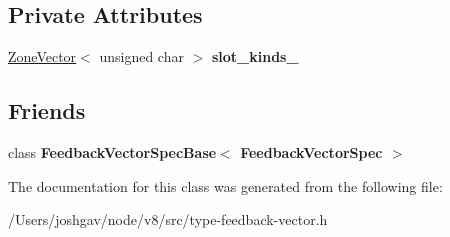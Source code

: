 \subsection*{Private Attributes}
\begin{DoxyCompactItemize}
\item 
\hyperlink{classv8_1_1internal_1_1_zone_vector}{Zone\+Vector}$<$ unsigned char $>$ {\bfseries slot\+\_\+kinds\+\_\+}\hypertarget{classv8_1_1internal_1_1_feedback_vector_spec_a866f2e673751d7879cc5f1a30edaa38d}{}\label{classv8_1_1internal_1_1_feedback_vector_spec_a866f2e673751d7879cc5f1a30edaa38d}

\end{DoxyCompactItemize}
\subsection*{Friends}
\begin{DoxyCompactItemize}
\item 
class {\bfseries Feedback\+Vector\+Spec\+Base$<$ Feedback\+Vector\+Spec $>$}\hypertarget{classv8_1_1internal_1_1_feedback_vector_spec_ad18506f11bb0655f03871b11355bb873}{}\label{classv8_1_1internal_1_1_feedback_vector_spec_ad18506f11bb0655f03871b11355bb873}

\end{DoxyCompactItemize}


The documentation for this class was generated from the following file\+:\begin{DoxyCompactItemize}
\item 
/\+Users/joshgav/node/v8/src/type-\/feedback-\/vector.\+h\end{DoxyCompactItemize}
